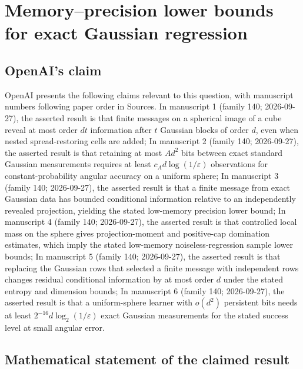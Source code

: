 \documentclass[11pt]{article}
\begin{document}
\section*{Memory–precision lower bounds for exact Gaussian regression}

\subsection{OpenAI's claim}
OpenAI presents the following claims relevant to this question, with manuscript numbers following paper order in Sources. In manuscript 1 (family 140; 2026-09-27), the asserted result is that finite messages on a spherical image of a cube reveal at most order $dt$ information after $t$ Gaussian blocks of order $d$, even when nested spread-restoring cells are added; In manuscript 2 (family 140; 2026-09-27), the asserted result is that retaining at most $Ad^2$ bits between exact standard Gaussian measurements requires at least $c_A d\log(1/\varepsilon)$ observations for constant-probability angular accuracy on a uniform sphere; In manuscript 3 (family 140; 2026-09-27), the asserted result is that a finite message from exact Gaussian data has bounded conditional information relative to an independently revealed projection, yielding the stated low-memory precision lower bound; In manuscript 4 (family 140; 2026-09-27), the asserted result is that controlled local mass on the sphere gives projection-moment and positive-cap domination estimates, which imply the stated low-memory noiseless-regression sample lower bounds; In manuscript 5 (family 140; 2026-09-27), the asserted result is that replacing the Gaussian rows that selected a finite message with independent rows changes residual conditional information by at most order $d$ under the stated entropy and dimension bounds; In manuscript 6 (family 140; 2026-09-27), the asserted result is that a uniform-sphere learner with $o(d^2)$ persistent bits needs at least $2^{-16}d\log_2(1/\varepsilon)$ exact Gaussian measurements for the stated success level at small angular error.

\subsection{Mathematical statement of the claimed result}
\end{document}
